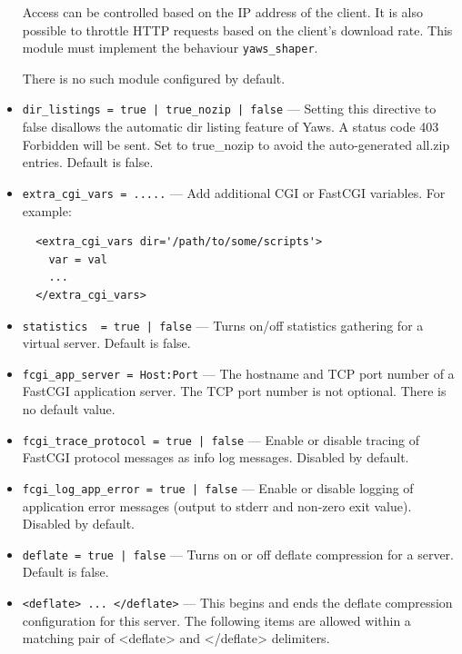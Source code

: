 \documentclass[11pt,oneside,english]{book}
\newcommand{\Yaws}            %
        {{\sc Yaws}}
\begin{document}
\begin{itemize}
              Access can be controlled based on the IP address of the client. It
              is also possible to throttle HTTP requests based on the client's
              download rate. This module must implement the behaviour
              \verb+yaws_shaper+.

              There is no such module configured by default.

\item       \verb+dir_listings = true | true_nozip | false+ ---
             Setting this directive to false disallows the automatic dir listing
             feature of \Yaws{}. A status code 403 Forbidden will be sent.  Set
             to true\_nozip to avoid the auto-generated all.zip entries. Default
             is false.

\item       \verb+extra_cgi_vars = .....+ ---
             Add additional CGI or FastCGI variables. For example:
\begin{verbatim}
  <extra_cgi_vars dir='/path/to/some/scripts'>
    var = val
    ...
  </extra_cgi_vars>
\end{verbatim}

\item       \verb+statistics  = true | false+ ---
             Turns on/off statistics gathering for a virtual server. Default is
             false.

\item       \verb+fcgi_app_server = Host:Port+ ---
             The hostname and TCP port number of a FastCGI application
             server. The TCP port number is not optional. There is no default
             value.

\item       \verb+fcgi_trace_protocol = true | false+ ---
             Enable or disable tracing of FastCGI protocol messages as info log
             messages. Disabled by default.

\item       \verb+fcgi_log_app_error = true | false+ ---
             Enable or disable logging of application error messages (output to
             stderr and non-zero exit value). Disabled by default.

\item       \verb+deflate = true | false+ ---
             Turns on or off deflate compression for a server. Default is
             false.

\item       \verb+<deflate> ... </deflate>+ ---
             This begins and ends the deflate compression configuration for this
             server. The following items are allowed within a matching pair of
             <deflate> and </deflate> delimiters.


\end{itemize}
\end{document}
